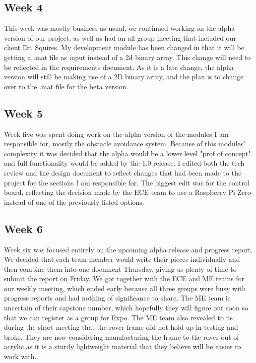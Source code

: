 \documentclass[10pt,letterpaper,onecolumn,draftclsnofoot,journal]{IEEEtran}
\begin{document}
\subsection{Week 4}
This week was mostly business as usual, we continued working on the alpha version of our project, as well as had an all group meeting that included our client Dr. Squires. My development module has been changed in that it will be getting a .mat file as input instead of a 2d binary array. This change will need to be reflected in the requirements document. As it is a late change, the alpha version will still be making use of a 2D binary array, and the plan is to change over to the .mat file for the beta version.

\subsection{Week 5}
Week five was spent doing work on the alpha version of the modules I am responsible for, mostly the obstacle avoidance system. Because of this modules' complexity it was decided that the alpha would be a lower level "prof of concept" and full functionality would be added by the 1.0 release. I edited both the tech review and the design document to reflect changes that had been made to the project for the sections I am responsible for. The biggest edit was for the control board, reflecting the decision made by the ECE team to use a Raspberry Pi Zero instead of one of the previously listed options.

\subsection{Week 6}
Week six was focused entirely on the upcoming alpha release and progress report. We decided that each team member would write their pieces individually and then combine them into one document Thursday, giving us plenty of time to submit the report on Friday. We got together with the ECE and ME teams for our weekly meeting, which ended early because all three groups were busy with progress reports and had nothing of significance to share. The ME team is uncertain of their capstone number, which hopefully they will figure out soon so that we can register as a group for Expo. The ME team also revealed to us during the short meeting that the rover frame did not hold up in testing and broke. They are now considering manufacturing the frame to the rover out of acrylic as it is a sturdy lightweight material that they believe will be easier to work with.
\end{document}
